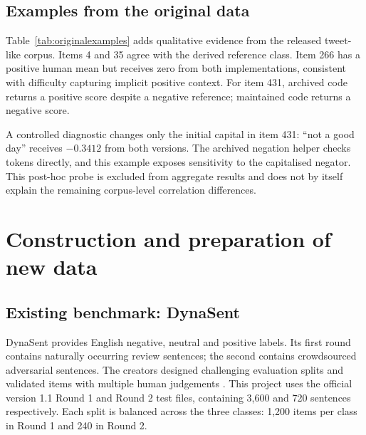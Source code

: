 \documentclass[11pt]{article}
\begin{document}
\subsection{Examples from the original data}
Table~\ref{tab:originalexamples} adds qualitative evidence from the released
tweet-like corpus. Items 4 and 35 agree with the derived reference class. Item 266
has a positive human mean but receives zero from both implementations, consistent
with difficulty capturing implicit positive context. For item 431, archived code
returns a positive score despite a negative reference; maintained code returns
a negative score.

\begin{table}[t]
\centering\small

\caption{Observed original-data examples. Reference classes use the explicitly
provisional human-mean/4 policy and fixed thresholds. Items were selected after
evaluation to illustrate agreement and disagreement; they do not estimate error
prevalence.}
\label{tab:originalexamples}
\end{table}

A controlled diagnostic changes only the initial capital in item 431:
``not a good day'' receives $-0.3412$ from both versions. The archived negation
helper checks tokens directly, and this example exposes sensitivity to the
capitalised negator. This post-hoc probe is excluded from aggregate results and
does not by itself explain the remaining corpus-level correlation differences.

\section{Construction and preparation of new data}

\subsection{Existing benchmark: DynaSent}
DynaSent provides English negative, neutral and positive labels. Its first round
contains naturally occurring review sentences; the second contains crowdsourced
adversarial sentences. The creators designed challenging evaluation splits and
validated items with multiple human judgements \citep{potts2021dynasent}. This
project uses the official version 1.1 Round 1 and Round 2 test files, containing
3,600 and 720 sentences respectively. Each split is balanced across the three
classes: 1,200 items per class in Round 1 and 240 in Round 2.
\end{document}
